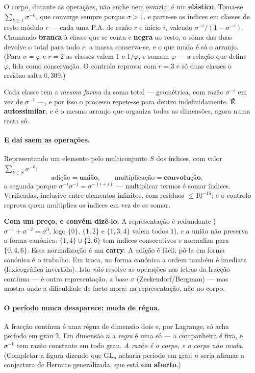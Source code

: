 \documentclass[11pt]{article}
\providecommand{\GL}{\mathrm{GL}}
\theoremstyle{plain}
\theoremstyle{remark}
\begin{document}
\begin{itemize}
O corpo, durante as operações, não enche nem esvazia: é um \textbf{elástico}. Toma-se
$\sum_{k\geq1}\sigma^{-k}$, que converge sempre porque $\sigma>1$, e parte-se os índices em classes
de resto módulo $r$ --- cada uma P.A. de razão $r$ e início $i$, valendo
$\sigma^{-i}/(1-\sigma^{-r})$. Chamando \textbf{branca} à classe que se conta e \textbf{negra} ao
resto, a soma das duas devolve o total para todo $r$: a massa conserva-se, e o que muda é só o
arranjo. (Para $\sigma=\varphi$ e $r=2$ as classes valem $1$ e $1/\varphi$, e somam $\varphi$ --- a
relação que define $\varphi$, lida como conservação. O controlo reprova: com $r=3$ e só duas
classes o resíduo salta $0{,}309$.)

Cada classe tem a \emph{mesma forma} da soma total --- geométrica, com razão $\sigma^{-r}$ em vez
de $\sigma^{-1}$ ---, e por isso o processo repete-se para dentro indefinidamente. \textbf{É
autossimilar}, e é o mesmo arranjo que organiza todas as dimensões, agora numa recta só.

\paragraph{E daí saem as operações.} Representando um elemento pelo multiconjunto $S$ dos índices,
com valor $\sum_{k\in S}\sigma^{-k}$:
\[
 \text{adição} = \textbf{união}, \qquad \text{multiplicação} = \textbf{convolução},
\]
a segunda porque $\sigma^{-i}\sigma^{-j}=\sigma^{-(i+j)}$ --- multiplicar termos é somar índices.
Verificadas, inclusive entre elementos infinitos, com resíduos $\leq10^{-16}$; e o controlo reprova
quem multiplica os índices em vez de os somar.

\textbf{Com um preço, e convém dizê-lo.} A representação é redundante ($\sigma^{-1}+\sigma^{-2} =
\sigma^0$, logo $\{0\}$, $\{1,2\}$ e $\{1,3,4\}$ valem todos $1$), e a união não preserva a forma
canónica: $\{1,4\}\cup\{2,6\}$ tem índices consecutivos e normaliza para $\{0,4,6\}$. Essa
normalização é um \textbf{carry}. A adição é fácil; pô-la em forma canónica é o trabalho. Em troca,
na forma canónica a ordem também é imediata (lexicográfica invertida). Isto \emph{não} resolve as
operações nas letras da fracção contínua --- é outra representação, a base $\sigma$
(Zeckendorf/Bergman) --- mas mostra onde a dificuldade de facto mora: na representação, não no
corpo.

\paragraph{O período nunca desaparece: muda de régua.} A fracção contínua é uma régua de dimensão
dois e, por Lagrange, só acha período em grau $2$. Em dimensão $n$ a \emph{regra} é uma só --- a
companheira é fixa, e $\sigma^{-k}$ tem razão constante em todo grau. \emph{A razão é o corpo, e o
corpo não muda.} (Completar a figura dizendo que $\GL_n$ acharia período em grau $n$ seria afirmar
a conjectura de Hermite generalizada, que está \textbf{em aberto}.)



\end{itemize}
\end{document}
